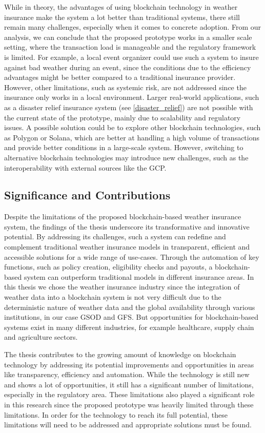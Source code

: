 While in theory, the advantages of using blockchain technology in weather insurance make the system a lot better than traditional systems, there still remain many challenges, especially when it comes to concrete adoption. From our analysis, we can conclude that the proposed prototype works in a smaller scale setting, where the transaction load is manageable and the regulatory framework is limited. For example, a local event organizer could use such a system to insure against bad weather during an event, since the conditions due to the efficiency advantages might be better compared to a traditional insurance provider. However, other limitations, such as systemic risk, are not addressed since the insurance only works in a local environment. Larger real-world applications, such as a disaster relief insurance system (see \cref{disaster_relief}) are not possible with the current state of the prototype, mainly due to scalability and regulatory issues. A possible solution could be to explore other blockchain technologies, such as Polygon or Solana, which are better at handling a high volume of transactions and provide better conditions in a large-scale system. However, switching to alternative blockchain technologies may introduce new challenges, such as the interoperability with external sources like the GCP.

\subsection{Significance and Contributions}
Despite the limitations of the proposed blockchain-based weather insurance system, the findings of the thesis underscore its transformative and innovative potential. By addressing its challenges, such a system can redefine and complement traditional weather insurance models in transparent, efficient and accessible solutions for a wide range of use-cases. Through the automation of key functions, such as policy creation, eligibility checks and payouts, a blockchain-based system can outperform traditional models in different insurance areas. In this thesis we chose the weather insurance industry since the integration of weather data into a blockchain system is not very difficult due to the deterministic nature of weather data and the global availability through various institutions, in our case GSOD and GFS. But opportunities for blockchain-based systems exist in many different industries, for example healthcare, supply chain and agriculture sectors.

The thesis contributes to the growing amount of knowledge on blockchain technology by addressing its potential improvements and opportunities in areas like transparency, efficiency and automation. While the technology is still new and shows a lot of opportunities, it still has a significant number of limitations, especially in the regulatory area. These limitations also played a significant role in this research since the proposed prototype was heavily limited through these limitations. In order for the technology to reach its full potential, these limitations will need to be addressed and appropriate solutions must be found.

